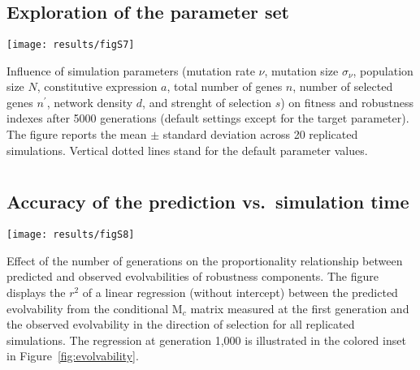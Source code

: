 \documentclass[10pt,a4paper]{article}
\newcommand{\M}{\bm{\mathrm M}}
\begin{document}
\begin{appendices}
  \clearpage
  \section{}
    \label{supp:explo}
    \subsection*{Exploration of the parameter set}
	\begin{adjustwidth}{-2.5in}{0in}
	\texttt{[image: results/figS7]} 
	\end{adjustwidth}
	{\color{Gray}Influence of simulation parameters (mutation rate $\nu$, mutation size $\sigma_\nu$, population size $N$, constitutive expression $a$, total number of genes $n$, number of selected genes $n^\prime$, network density $d$, and strenght of selection $s$) on fitness and robustness indexes after 5000 generations (default settings except for the target parameter). The figure reports the mean $\pm$ standard deviation across 20 replicated simulations. Vertical dotted lines stand for the default parameter values. }


	
  \clearpage
  \section{}
    \label{supp:r2evolv}
    \subsection*{Accuracy of the prediction vs.\ simulation time}
	\begin{center}
	\texttt{[image: results/figS8]} 
	\end{center}
	
	{\color{Gray} Effect of the number of generations on the proportionality relationship between predicted and observed evolvabilities of robustness components. The figure displays the $r^2$ of a linear regression (without intercept) between the predicted evolvability from the conditional $\M_c$ matrix measured at the first generation and the observed evolvability in the direction of selection for all replicated simulations. The regression at generation 1,000 is illustrated in the colored inset in Figure~\ref{fig:evolvability}. }
	
	
  \clearpage
  \section{}
    \label{supp:cordirsel}

\end{appendices}
\end{document}
